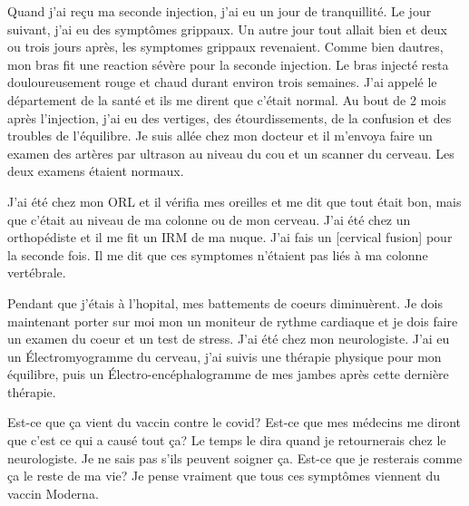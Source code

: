 Quand j'ai reçu ma seconde injection, j'ai eu un jour de tranquillité. Le jour
suivant, j'ai eu des symptômes grippaux. Un autre jour tout allait bien et deux
ou trois jours après, les symptomes grippaux revenaient. Comme bien dautres, mon
bras fit une reaction sévère pour la seconde injection. Le bras injecté resta
douloureusement rouge et chaud durant environ trois semaines. J'ai appelé le
département de la santé et ils me dirent que c'était normal. Au bout de 2 mois
après l'injection, j'ai eu des vertiges, des étourdissements, de la confusion et
des troubles de l'équilibre. Je suis allée chez mon docteur et il m'envoya faire
un examen des artères par ultrason au niveau du cou et un scanner du
cerveau. Les deux examens étaient normaux.

J'ai été chez mon ORL et il vérifia mes oreilles et me dit que tout était bon,
mais que c'était au niveau de ma colonne ou de mon cerveau. J'ai été chez un
orthopédiste et il me fit un IRM de ma nuque. J'ai fais un [cervical fusion]
pour la seconde fois. Il me dit que ces symptomes n'étaient pas liés à ma
colonne vertébrale.

Pendant que j'étais à l'hopital, mes battements de coeurs diminuèrent. Je dois
maintenant porter sur moi mon un moniteur de rythme cardiaque et je dois faire
un examen du coeur et un test de stress. J'ai été chez mon neurologiste. J'ai eu
un Électromyogramme du cerveau, j'ai suivis une thérapie physique pour mon
équilibre, puis un Électro-encéphalogramme de mes jambes après cette dernière
thérapie.

Est-ce que ça vient du vaccin contre le covid?  Est-ce que mes médecins me
diront que c'est ce qui a causé tout ça? Le temps le dira quand je retournerais
chez le neurologiste. Je ne sais pas s'ils peuvent soigner ça. Est-ce que je
resterais comme ça le reste de ma vie? Je pense vraiment que tous ces symptômes
viennent du vaccin Moderna.

